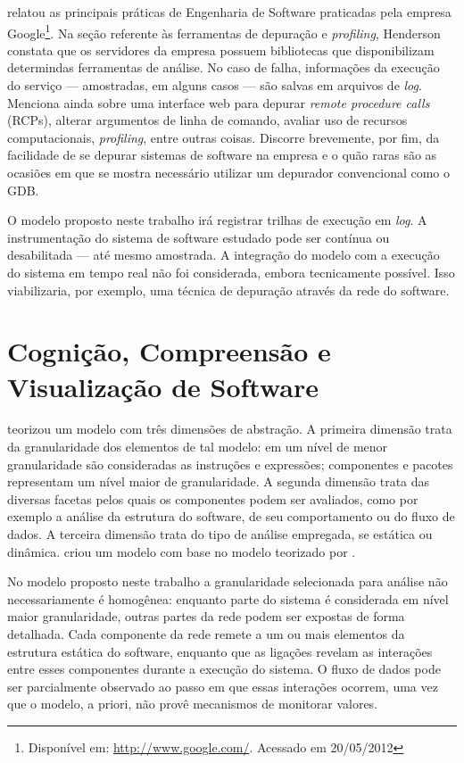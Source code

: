  relatou as principais práticas de
Engenharia de Software praticadas pela empresa Google\footnote{Disponível em:
\href{http://www.google.com/}{http://www.google.com/}. Acessado em 20/05/2012}.
Na seção referente às ferramentas de depuração e \textit{profiling}, Henderson
constata que os servidores da empresa possuem bibliotecas que disponibilizam
determindas ferramentas de análise. No caso de falha, informações da execução do
serviço --- amostradas, em alguns casos --- são salvas em arquivos de
\textit{log}. Menciona ainda sobre uma interface web para depurar 
\textit{remote procedure calls} (RCPs), alterar argumentos de linha de comando,
avaliar uso de recursos computacionais, \textit{profiling}, entre outras coisas.
Discorre brevemente, por fim, da facilidade de se depurar sistemas de software
na empresa e o quão raras são as ocasiões em que se mostra necessário utilizar
um depurador convencional como o GDB.

O modelo proposto neste trabalho irá registrar trilhas de execução em
\textit{log}. A instrumentação do sistema de software estudado pode ser
contínua ou desabilitada --- até mesmo amostrada. A integração do modelo com
a execução do sistema em tempo real não foi considerada, embora tecnicamente
possível. Isso viabilizaria, por exemplo, uma técnica de depuração através da
rede do software.

\section{Cognição, Compreensão e Visualização de Software}
\label{sec:SoftwareCognition}

 teorizou um modelo com três dimensões de
abstração.
A primeira dimensão trata da granularidade dos elementos de tal
modelo: em um nível de menor granularidade são consideradas as instruções e
expressões; componentes e pacotes representam um nível maior de granularidade.
A segunda dimensão trata das diversas facetas pelos quais os componentes podem
ser avaliados, como por exemplo a análise da estrutura do software, de seu 
comportamento ou do fluxo de dados.
A terceira dimensão trata do tipo de análise empregada, se estática ou dinâmica.
 criou um modelo com base no modelo
teorizado por .

No modelo proposto neste trabalho a granularidade selecionada para análise não
necessariamente é homogênea: enquanto parte do sistema é considerada em nível
maior granularidade, outras partes da rede podem ser expostas de forma
detalhada. Cada componente da rede remete a um ou mais elementos da estrutura
estática do software, enquanto que as ligações revelam as interações entre esses
componentes durante a execução do sistema. O fluxo de dados pode ser
parcialmente observado ao passo em que essas interações ocorrem, uma vez que o
modelo, a priori, não provê mecanismos de monitorar valores.

